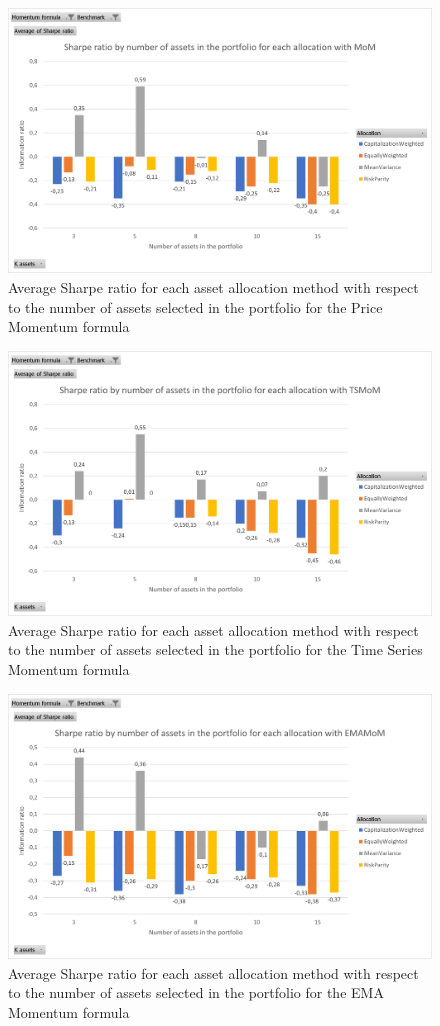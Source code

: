 \documentclass{article}
\begin{document}
\begin{figure}[H] %
    \centering
\includegraphics[width=0.75\linewidth]{absolute_management/Sharpe ratio MoM.png}
    \caption{Average Sharpe ratio for each asset allocation method with respect to the number of assets selected in the portfolio for the Price Momentum formula}
    \label{fig:Sharpe ratio MoM}
\end{figure}

\begin{figure}[H] %
    \centering
    \includegraphics[width=0.75\linewidth]{absolute_management/Sharpe ratio TSMoM.png}
    \caption{Average Sharpe ratio for each asset allocation method with respect to the number of assets selected in the portfolio for the Time Series Momentum formula}
    \label{fig:Sharpe ratio TSMOM}
\end{figure}

\begin{figure}[H] %
    \centering
    \includegraphics[width=0.75\linewidth]{absolute_management/Sharpe ratio_EMAMoM.png}
    \caption{Average Sharpe ratio for each asset allocation method with respect to the number of assets selected in the portfolio for the EMA Momentum formula}
    \label{fig:Sharpe ratio EMAMOM}
\end{figure}
\end{document}
